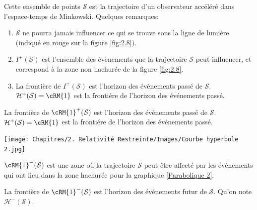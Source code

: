 {Cette ensemble de points $\mathcal{S}$ est la trajectoire d'un observateur accéléré dans l'espace-temps de Minkowski. Quelques remarques:
\begin{enumerate}
    \item $\mathcal{S}$ ne pourra jamais influencer ce qui se trouve sous la ligne de lumière  (indiqué en rouge sur la figure \ref{fig:2.8}). 

    \item $I^{+}(\mathcal{S})$ est l'ensemble des évènements que la trajectoire $\mathcal{S}$ peut influencer, et correspond à la zone non hachurée de la figure \ref{fig:2.8}.

    \item La frontière de $I^{+}(\mathcal{S})$ est l'horizon des événements passé de $\mathcal{S}$. $\mathcal{H}^{+}(\mathcal{S}) = \cRM{1}$ est la frontiére de l'horizon des événements passé. 
\end{enumerate}



La frontière de $\cRM{1}^{+}(\mathcal{S})$ est l'horizon des événements passé de $\mathcal{S}$. $\mathcal{H}^{+}(\mathcal{S}) = \cRM{1}$ est la frontiére de l'horizon des événements passé. 

\begin{center}
\texttt{[image: Chapitres/2. Relativité Restreinte/Images/Courbe hyperbole 2.jpg]}
\label{Parabolique 2}
\end{center}

$\cRM{1}^{-}(\mathcal{S})$ est une zone où la trajectoire $\mathcal{S}$ peut être affecté par les événements qui ont lieu dans la zone hachurée pour la graphique \ref{Parabolique 2}. 

La frontière de $\cRM{1}^{-}(\mathcal{S})$ est l'horizon des événements futur  de $\mathcal{S}$. Qu'on note $\mathcal{H}^{-}(\mathcal{S})$.
}
